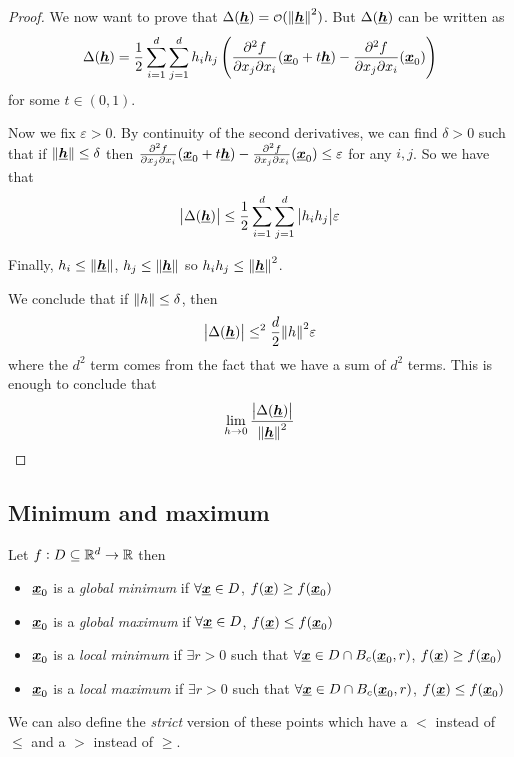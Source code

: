 \documentclass[12pt]{extarticle}
\renewcommand{\vec}[1]{\uvec{#1}}
\begin{document}
\begin{proof}
    We now want to prove that $\Delta(\vec h) = \o(\norm {\vec h}^2)$. But $\Delta(\vec h)$ can be written as
    \begin{equation}
        \Delta(\vec h) = \frac{1}{2}  \sum^d_{i = 1} \sum^d_{j = 1} h_i h_j \left( \pdv[2]{f}{x_j}{x_i}()(\vec x_0 + t \vec h)- \pdv[2]{f}{x_j}{x_i}()(\vec x_0)\right)
    \end{equation}
    for some $t \in (0, 1)$.

    Now we fix $\varepsilon > 0$. By continuity of the second derivatives, we can find $\delta > 0$ such that if $\norm {\vec{h}} \leq \delta$ then $ \pdv[2]{f}{x_j}{x_i}()(\vec x_0 + t \vec h)- \pdv[2]{f}{x_j}{x_i}()(\vec x_0) \leq \varepsilon$ for any $i, j$.
    So we have that
    \begin{equation}
        \abs{\Delta(\vec h)} \leq \frac{1}{2}  \sum^d_{i = 1} \sum^d_{j = 1} \abs{h_i h_j} \varepsilon
    \end{equation}

    Finally, $h_i \leq \norm{\vec{h}}$, $h_j \leq \norm{\vec{h}}$ so $h_i h_j \leq \norm{\vec{h}}^2$.

    We conclude that if $\norm{h} \leq \delta$, then
    \begin{equation}
        \abs{\Delta(\vec h)} \leq^2 \frac{d}{2} \norm{h}^2 \varepsilon
    \end{equation}
    where the $d^2$ term comes from the fact that we have a sum of $d^2$ terms.
    This is enough to conclude that
    \begin{equation}
        \lim_{h \to 0} \frac{\abs{\Delta(\vec h)}}{\norm{\vec h}^2}
    \end{equation}
\end{proof}

\subsection{Minimum and maximum}

\begin{definition}
    Let $f: D\subseteq \mathbb{R}^d \to \mathbb{R}$ then
    \begin{itemize}
        \item $\vec x_0$ is a \emph{global minimum} if $\forall \vec x \in D$, $f(\vec x) \geq f(\vec x_0)$
        \item $\vec x_0$ is a \emph{global maximum} if $\forall \vec x \in D$, $f(\vec x) \leq f(\vec x_0)$
        \item $\vec x_0$ is a \emph{local minimum} if $\exists r > 0$ such that $\forall \vec x \in D \cap B_c(\vec x_0, r)$, $f(\vec x) \geq f(\vec x_0)$
        \item $\vec x_0$ is a \emph{local maximum} if $\exists r > 0$ such that $\forall \vec x \in D \cap B_c(\vec x_0, r)$, $f(\vec x) \leq f(\vec x_0)$
    \end{itemize}

    We can also define the \emph{strict} version of these points which have a $<$ instead of $\leq$ and a $>$ instead of $\geq$.
\end{definition}
\end{document}
